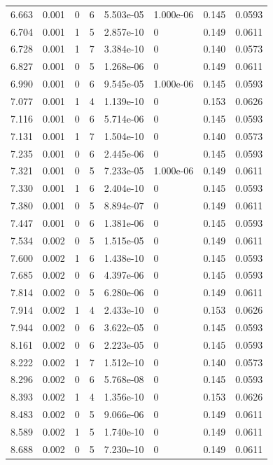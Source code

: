 \documentclass[preview]{standalone}
\begin{document}
{{{\begin{tabular}{L{1.2cm}C{1.2cm} C{0.3cm}C{0.5cm} C{1.4cm}C{1.4cm} C{1.4cm}C{1.4cm}}
  6.663  &  0.001  & 0     &  6 &  5.503e-05  & 1.000e-06  & 0.145 &  0.0593   \\ 
  6.704  &  0.001  & 1     &  5 &  2.857e-10  & 0  & 0.149 &  0.0611   \\ 
  6.728  &  0.001  & 1     &  7 &  3.384e-10  & 0  & 0.140 &  0.0573   \\ 
  6.827  &  0.001  & 0     &  5 &  1.268e-06  & 0  & 0.149 &  0.0611   \\ 
  6.990  &  0.001  & 0     &  6 &  9.545e-05  & 1.000e-06  & 0.145 &  0.0593   \\ 
  7.077  &  0.001  & 1     &  4 &  1.139e-10  & 0  & 0.153 &  0.0626   \\ 
  7.116  &  0.001  & 0     &  6 &  5.714e-06  & 0  & 0.145 &  0.0593   \\ 
  7.131  &  0.001  & 1     &  7 &  1.504e-10  & 0  & 0.140 &  0.0573   \\ 
  7.235  &  0.001  & 0     &  6 &  2.445e-06  & 0  & 0.145 &  0.0593   \\ 
  7.321  &  0.001  & 0     &  5 &  7.233e-05  & 1.000e-06  & 0.149 &  0.0611   \\ 
  7.330  &  0.001  & 1     &  6 &  2.404e-10  & 0  & 0.145 &  0.0593   \\ 
  7.380  &  0.001  & 0     &  5 &  8.894e-07  & 0  & 0.149 &  0.0611   \\ 
  7.447  &  0.001  & 0     &  6 &  1.381e-06  & 0  & 0.145 &  0.0593   \\ 
  7.534  &  0.002  & 0     &  5 &  1.515e-05  & 0  & 0.149 &  0.0611   \\ 
  7.600  &  0.002  & 1     &  6 &  1.438e-10  & 0  & 0.145 &  0.0593   \\ 
  7.685  &  0.002  & 0     &  6 &  4.397e-06  & 0  & 0.145 &  0.0593   \\ 
  7.814  &  0.002  & 0     &  5 &  6.280e-06  & 0  & 0.149 &  0.0611   \\ 
  7.914  &  0.002  & 1     &  4 &  2.433e-10  & 0  & 0.153 &  0.0626   \\ 
  7.944  &  0.002  & 0     &  6 &  3.622e-05  & 0  & 0.145 &  0.0593   \\ 
  8.161  &  0.002  & 0     &  6 &  2.223e-05  & 0  & 0.145 &  0.0593   \\ 
  8.222  &  0.002  & 1     &  7 &  1.512e-10  & 0  & 0.140 &  0.0573   \\ 
  8.296  &  0.002  & 0     &  6 &  5.768e-08  & 0  & 0.145 &  0.0593   \\ 
  8.393  &  0.002  & 1     &  4 &  1.356e-10  & 0  & 0.153 &  0.0626   \\ 
  8.483  &  0.002  & 0     &  5 &  9.066e-06  & 0  & 0.149 &  0.0611   \\ 
  8.589  &  0.002  & 1     &  5 &  1.740e-10  & 0  & 0.149 &  0.0611   \\ 
  8.688  &  0.002  & 0     &  5 &  7.230e-10  & 0  & 0.149 &  0.0611   \\ 
\hline 
\end{tabular} 

}}}
\end{document}
